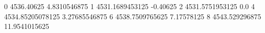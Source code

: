 0 4536.40625 4.8310546875
1 4531.1689453125 -0.40625
2 4531.5751953125 0.0
4 4534.85205078125 3.27685546875
6 4538.7509765625 7.17578125
8 4543.529296875 11.9541015625
